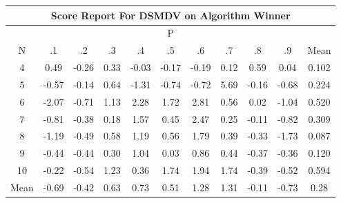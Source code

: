 \documentclass[11pt,a4paper]{report}
\begin{document}
\begin{longtable}{ | c || c | c | c | c | c | c | c | c | c || c |}
\hline
\multicolumn{11}{|c|}{ Score Report For DSMDV on Algorithm Winner} \\
\hline
\multicolumn{11}{|c|}{ P } \\
\hline
N & .1 & .2 & .3 & .4 & .5 & .6 & .7 & .8 & .9 & Mean\\
 \hline
 \hline
 \endhead
  4 &  \cellcolor[HTML]{EFEFFF} 0.49 &  \cellcolor[HTML]{FFF7F7} -0.26 &  \cellcolor[HTML]{F7F7FF} 0.33 &  \cellcolor[HTML]{FFFFFF} -0.03 &  \cellcolor[HTML]{FFF7F7} -0.17 &  \cellcolor[HTML]{FFF7F7} -0.19 &  \cellcolor[HTML]{FFFFFF} 0.12 &  \cellcolor[HTML]{EFEFFF} 0.59 &  \cellcolor[HTML]{FFFFFF} 0.04 & 0.102 \\
  5 &  \cellcolor[HTML]{FFEFEF} -0.57 &  \cellcolor[HTML]{FFFFFF} -0.14 &  \cellcolor[HTML]{EFEFFF} 0.64 &  \cellcolor[HTML]{FFDFDF} -1.31 &  \cellcolor[HTML]{FFEFEF} -0.74 &  \cellcolor[HTML]{FFEFEF} -0.72 &  \cellcolor[HTML]{7070FF} 5.69 &  \cellcolor[HTML]{FFF7F7} -0.16 &  \cellcolor[HTML]{FFEFEF} -0.68 & 0.224 \\
  6 &  \cellcolor[HTML]{FFC7C7} -2.07 &  \cellcolor[HTML]{FFEFEF} -0.71 &  \cellcolor[HTML]{DFDFFF} 1.13 &  \cellcolor[HTML]{C7C7FF} 2.28 &  \cellcolor[HTML]{D7D7FF} 1.72 &  \cellcolor[HTML]{B7B7FF} 2.81 &  \cellcolor[HTML]{EFEFFF} 0.56 &  \cellcolor[HTML]{FFFFFF} 0.02 &  \cellcolor[HTML]{FFE7E7} -1.04 & 0.520 \\
  7 &  \cellcolor[HTML]{FFE7E7} -0.81 &  \cellcolor[HTML]{FFF7F7} -0.38 &  \cellcolor[HTML]{F7F7FF} 0.18 &  \cellcolor[HTML]{D7D7FF} 1.57 &  \cellcolor[HTML]{F7F7FF} 0.45 &  \cellcolor[HTML]{BFBFFF} 2.47 &  \cellcolor[HTML]{F7F7FF} 0.25 &  \cellcolor[HTML]{FFFFFF} -0.11 &  \cellcolor[HTML]{FFE7E7} -0.82 & 0.309 \\
  8 &  \cellcolor[HTML]{FFDFDF} -1.19 &  \cellcolor[HTML]{FFEFEF} -0.49 &  \cellcolor[HTML]{EFEFFF} 0.58 &  \cellcolor[HTML]{DFDFFF} 1.19 &  \cellcolor[HTML]{EFEFFF} 0.56 &  \cellcolor[HTML]{CFCFFF} 1.79 &  \cellcolor[HTML]{F7F7FF} 0.39 &  \cellcolor[HTML]{FFF7F7} -0.33 &  \cellcolor[HTML]{FFD7D7} -1.73 & 0.087 \\
  9 &  \cellcolor[HTML]{FFF7F7} -0.44 &  \cellcolor[HTML]{FFF7F7} -0.44 &  \cellcolor[HTML]{F7F7FF} 0.30 &  \cellcolor[HTML]{E7E7FF} 1.04 &  \cellcolor[HTML]{FFFFFF} 0.03 &  \cellcolor[HTML]{E7E7FF} 0.86 &  \cellcolor[HTML]{F7F7FF} 0.44 &  \cellcolor[HTML]{FFF7F7} -0.37 &  \cellcolor[HTML]{FFF7F7} -0.36 & 0.120 \\
  10 &  \cellcolor[HTML]{FFF7F7} -0.22 &  \cellcolor[HTML]{FFEFEF} -0.54 &  \cellcolor[HTML]{DFDFFF} 1.23 &  \cellcolor[HTML]{F7F7FF} 0.36 &  \cellcolor[HTML]{D7D7FF} 1.74 &  \cellcolor[HTML]{CFCFFF} 1.94 &  \cellcolor[HTML]{D7D7FF} 1.74 &  \cellcolor[HTML]{FFF7F7} -0.39 &  \cellcolor[HTML]{FFEFEF} -0.52 & 0.594 \\
 \hline
 \hline
Mean &  \cellcolor[HTML]{FFEFEF} -0.69 &  \cellcolor[HTML]{FFF7F7} -0.42 &  \cellcolor[HTML]{EFEFFF} 0.63 &  \cellcolor[HTML]{EFEFFF} 0.73 &  \cellcolor[HTML]{EFEFFF} 0.51 &  \cellcolor[HTML]{DFDFFF} 1.28 &  \cellcolor[HTML]{DFDFFF} 1.31 &  \cellcolor[HTML]{FFFFFF} -0.11 &  \cellcolor[HTML]{FFEFEF} -0.73 &  \cellcolor[HTML]{F7F7FF} 0.28
\end{longtable}
\end{document}
